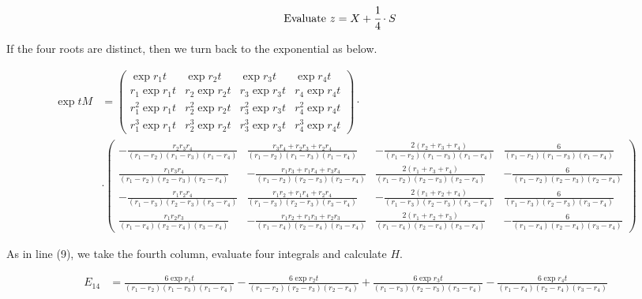 \documentclass[12pt]{article}
\begin{document}
\begin{align}
  &\text{Evaluate }z = X + \cfrac{1}{4}\cdot S
\end{align}

If the four roots are distinct, then we turn back to the exponential as below.

\footnotesize

\begin{align} 
\exp tM &=  \left(\begin{matrix}\exp{r_1 t} & \exp{r_2 t} & \exp{r_3 t} & \exp{r_4 t} \\ r_1 \exp{r_1 t} & r_2 \exp{r_2 t} & r_3 \exp{r_3 t} & r_4 \exp{r_4 t}  \\ r_1^2 \exp{r_1 t} & r_2^2 \exp{r_2 t} & r_3^2 \exp{r_3 t} & r_4^2 \exp{r_4 t} \\ r_1^3 \exp{r_1 t} & r_2^3 \exp{r_2 t} & r_3^3 \exp{r_3 t} & r_4^3 \exp{r_4 t}  \end{matrix}\right) \cdot \nonumber \\
&\cdot \begin{pmatrix} 
- \frac{r_2 r_3 r_4}{(r_1 - r_2)(r_1 - r_3)(r_1 - r_4)} & \frac{r_3 r_4 + r_2 r_3 + r_2 r_4}{(r_1 - r_2)(r_1 - r_3)(r_1 - r_4)}
& -\frac{2(r_2 + r_3 + r_4)}{(r_1 - r_2)(r_1 - r_3)(r_1 - r_4) } & \frac{6}{(r_1 - r_2)(r_1 - r_3)(r_1 - r_4)}  \\ 
\frac{r_1 r_3 r_4}{(r_1 - r_2)(r_2 - r_3)(r_2 - r_4)} & -\frac{r_1 r_3 + r_1 r_4 + r_3 r_4}{(r_1 - r_2)(r_2 - r_3)(r_2 - r_4)} 
& \frac{2(r_1 + r_3 + r_4)}{(r_1 - r_2)(r_2 - r_3)(r_2 - r_4)} & -\frac{6}{(r_1 - r_2)(r_2 - r_3)(r_2 - r_4)} \\ 
-\frac{r_1 r_2 r_4}{(r_1 - r_3)(r_2 - r_3)(r_3 - r_4)} & \frac{r_1 r_2 + r_1 r_4 + r_2 r_4}{(r_1 - r_3)(r_2 - r_3)(r_3 - r_4)} 
& -\frac{2(r_1 + r_2 + r_4)}{(r_1 - r_3)(r_2 - r_3)(r_3 - r_4)} & \frac{6}{(r_1 - r_3)(r_2 - r_3)(r_3 - r_4)} \\ 
\frac{r_1 r_2 r_3}{(r_1 - r_4)(r_2 - r_4)(r_3 - r_4)} & -\frac{r_1 r_2 + r_1 r_3 + r_2 r_3}{(r_1 - r_4)(r_2 - r_4)(r_3 - r_4)} 
& \frac{2(r_1 + r_2 + r_3)}{(r_1 - r_4)(r_2 - r_4)(r_3 - r_4)} & -\frac{6}{(r_1 - r_4)(r_2 - r_4)(r_3 - r_4)}  \end{pmatrix} 
\end{align} 

\normalsize

As in line (9), we take the fourth column, evaluate four integrals and calculate $H$.

\footnotesize

\begin{align}
E_{14} &= \frac{6\exp r_1 t}{(r_1 - r_2)(r_1 - r_3)(r_1 - r_4)} -\frac{6\exp r_2 t}{(r_1 - r_2)(r_2 - r_3)(r_2 - r_4)} + \frac{6\exp r_3 t}{(r_1 - r_3)(r_2 - r_3)(r_3 - r_4)} -\frac{6\exp r_4 t}{(r_1 - r_4)(r_2 - r_4)(r_3 - r_4)} \nonumber 
\end{align}
\end{document}
